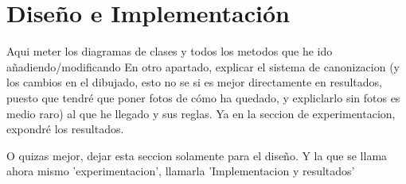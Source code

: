 \chapter{Diseño e Implementación}

Aqui meter los diagramas de clases y todos los metodos que he ido añadiendo/modificando
En otro apartado, explicar el sistema de canonizacion (y los cambios en el dibujado, esto no se si es mejor directamente en resultados, puesto que tendré que poner fotos de cómo ha quedado, y expliclarlo sin fotos es medio raro) al que he llegado y sus reglas. Ya en la seccion de experimentacion, expondré los resultados.

O quizas mejor, dejar esta seccion solamente para el diseño. Y la que se llama ahora mismo 'experimentacion', llamarla 'Implementacion y resultados'